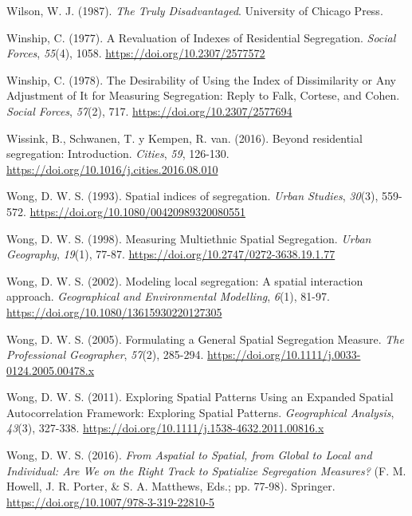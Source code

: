 \documentclass[
  spanish,
  a4paper,%
  chapterprefix=true,%
  DIV=calc,%
  twoside]{scrbook}%
\newlength{\cslhangindent}
\newenvironment{CSLReferences}[2] %
 {\begin{list}{}{%
  \setlength{\itemindent}{0pt}
  \setlength{\leftmargin}{0pt}
  \setlength{\parsep}{0pt}
  \ifodd #1
   \setlength{\leftmargin}{\cslhangindent}
   \setlength{\itemindent}{-1\cslhangindent}
  \fi
  \setlength{\itemsep}{#2\baselineskip}}}
 {\end{list}}
\begin{document}
\begin{CSLReferences}{1}{0}
Wilson, W. J. (1987). \emph{The Truly Disadvantaged}. University of Chicago Press.

Winship, C. (1977). A Revaluation of Indexes of Residential Segregation. \emph{Social Forces}, \emph{55}(4), 1058. \url{https://doi.org/10.2307/2577572}

Winship, C. (1978). The Desirability of Using the Index of Dissimilarity or Any Adjustment of It for Measuring Segregation: Reply to Falk, Cortese, and Cohen. \emph{Social Forces}, \emph{57}(2), 717. \url{https://doi.org/10.2307/2577694}

Wissink, B., Schwanen, T. y Kempen, R. van. (2016). Beyond residential segregation: Introduction. \emph{Cities}, \emph{59}, 126-130. \url{https://doi.org/10.1016/j.cities.2016.08.010}

Wong, D. W. S. (1993). Spatial indices of segregation. \emph{Urban Studies}, \emph{30}(3), 559-572. \url{https://doi.org/10.1080/00420989320080551}

Wong, D. W. S. (1998). Measuring Multiethnic Spatial Segregation. \emph{Urban Geography}, \emph{19}(1), 77-87. \url{https://doi.org/10.2747/0272-3638.19.1.77}

Wong, D. W. S. (2002). Modeling local segregation: A spatial interaction approach. \emph{Geographical and Environmental Modelling}, \emph{6}(1), 81-97. \url{https://doi.org/10.1080/13615930220127305}

Wong, D. W. S. (2005). Formulating a General Spatial Segregation Measure. \emph{The Professional Geographer}, \emph{57}(2), 285-294. \url{https://doi.org/10.1111/j.0033-0124.2005.00478.x}

Wong, D. W. S. (2011). Exploring Spatial Patterns Using an Expanded Spatial Autocorrelation Framework: Exploring Spatial Patterns. \emph{Geographical Analysis}, \emph{43}(3), 327-338. \url{https://doi.org/10.1111/j.1538-4632.2011.00816.x}

Wong, D. W. S. (2016). \emph{From Aspatial to Spatial, from Global to Local and Individual: Are We on the Right Track to Spatialize Segregation Measures?} (F. M. Howell, J. R. Porter, \& S. A. Matthews, Eds.; pp. 77-98). Springer. \url{https://doi.org/10.1007/978-3-319-22810-5}


\end{CSLReferences}
\end{document}
